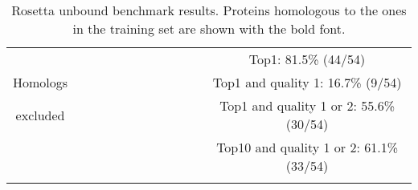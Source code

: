 \begin{longtable}{c c c c c c|c c c c c|c c c c c}
 \hline
& \multicolumn{5}{c}{} & \multicolumn{5}{c}{} & \multicolumn{5}{c}{\tiny Top1: 81.5\% (44/54)} \\ 
{\tiny Homologs}& \multicolumn{5}{c}{} & \multicolumn{5}{c}{} & \multicolumn{5}{c}{\tiny Top1 and quality 1: 16.7\% (9/54)}  \\ 
{\tiny excluded}& \multicolumn{5}{c}{} & \multicolumn{5}{c}{} & \multicolumn{5}{c}{\tiny Top1 and quality 1 or 2: 55.6\% (30/54)}  \\ 
 & \multicolumn{5}{c}{} & \multicolumn{5}{c}{} & \multicolumn{5}{c}{\tiny Top10 and quality 1 or 2: 61.1\% (33/54)}  \\
\caption[Rosetta unbound benchmark results]{Rosetta unbound benchmark results. Proteins homologous to the ones in the training set are shown with the bold font.}
\label{RosettaTable} 
 \end{longtable}